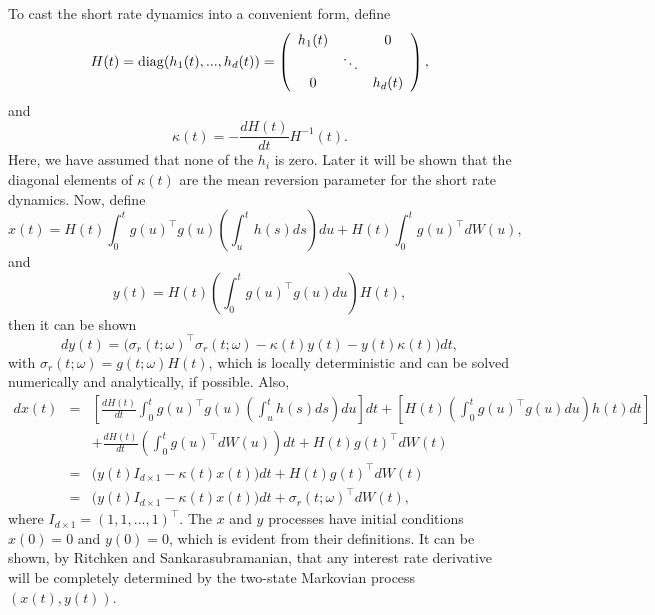 \documentclass[12pt]{article}
\begin{document}
  To cast the short rate dynamics into a convenient form, define
  \begin{equation}
    H(t)={\rm diag}(h_1(t),...,h_d(t))=\left(
      \begin{array}{ccc}
        h_1(t) & & 0 \\
          & \ddots & \\
          0 & & h_d(t)
      \end{array}
    \right),
  \end{equation}
  and
  \begin{equation}
    \kappa(t) = -\frac{dH(t)}{dt}H^{-1}(t).
  \end{equation}
  Here, we have assumed that none of the $h_i$ is zero. Later it will be shown that the diagonal elements of $\kappa(t)$
  are the mean reversion parameter for the short rate dynamics. Now, define
  \begin{equation}
    x(t)=H(t)\int_0^tg(u)^{\top}g(u)\left(\int_u^th(s)ds\right)du+H(t)\int_0^tg(u)^{\top}dW(u),
  \end{equation}
  and
  \begin{equation}
    y(t)=H(t)\left(\int_0^tg(u)^{\top}g(u)du\right)H(t),
    \label{y}
  \end{equation}
  then it can be shown
  \begin{equation}
    dy(t) = \bigg(\sigma_r(t;\omega)^{\top}\sigma_r(t;\omega) - \kappa(t)y(t) - y(t)\kappa(t)\bigg)dt,
  \end{equation}
  with $\sigma_r(t;\omega)=g(t;\omega)H(t)$, which is locally deterministic and can be solved numerically and analytically, if possible. Also,
  \begin{eqnarray}
    dx(t) &=& \left[\frac{dH(t)}{dt}\int_0^tg(u)^{\top}g(u)\left(\int_u^th(s)ds\right)du\right]dt
            + \left[H(t)\left(\int_0^tg(u)^{\top}g(u)du\right)h(t)dt\right]\nonumber\\
          &&+ \frac{dH(t)}{dt}\left(\int_0^tg(u)^{\top}dW(u)\right)dt
            + H(t)g(t)^{\top}dW(t)\nonumber\\
          &=& \bigg(y(t)I_{d\times 1}-\kappa(t)x(t)\bigg)dt+H(t)g(t)^{\top}dW(t)\nonumber\\
          &=& \bigg(y(t)I_{d\times 1}-\kappa(t)x(t)\bigg)dt+\sigma_r(t;\omega)^{\top}dW(t),
          \label{x}
  \end{eqnarray}
  where $I_{d\times 1}=(1,1,...,1)^{\top}$. The $x$ and $y$ processes have
  initial conditions $x(0)=0$ and $y(0)=0$, which is evident from their definitions. It can be shown,
  by Ritchken and Sankarasubramanian, that any interest rate derivative will be completely determined
  by the two-state Markovian process $(x(t), y(t))$.
\end{document}
